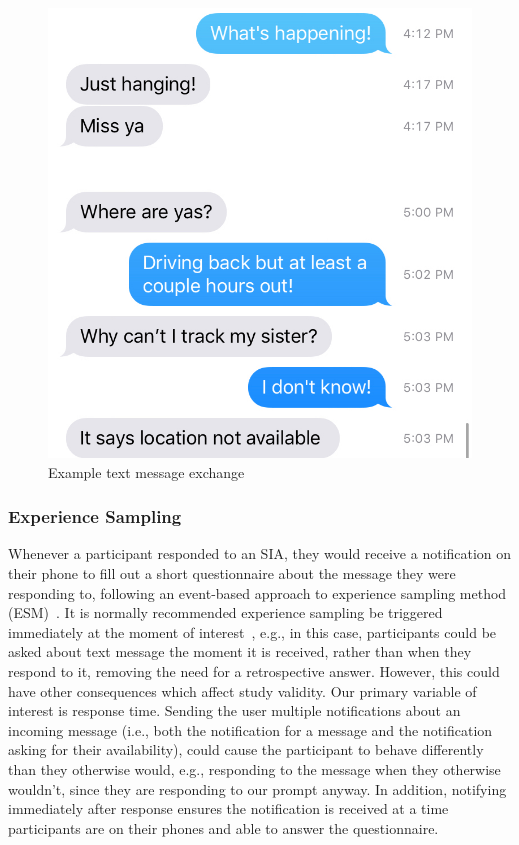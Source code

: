 \documentclass[12pt]{nuthesis}	%
\begin{document}
\begin{figure}[h]
\centering
\includegraphics[width=.7\textwidth]{figures/sia2}
\caption{Example text message exchange}
\label{fig:sia2}
\end{figure}


\subsubsection{Experience Sampling}
\label{sec:esm}

Whenever a participant responded to an SIA, they would receive a notification on their phone to fill out a short questionnaire about the message they were responding to, following an event-based approach to experience sampling method (ESM)~\citep{conner2009experience,csikszentmihalyi2014validity}. It is normally recommended experience sampling  be triggered immediately at the moment of interest~\citep{hormuth1986sampling}, e.g., in this case, participants could be asked about text message the moment it is received, rather than when they respond to it, removing the need for a retrospective answer. However, this could have other consequences which affect study validity. Our primary variable of interest is response time. Sending the user multiple notifications about an incoming message (i.e., both the notification for a message and the notification asking for their availability), could cause the participant to behave differently than they otherwise would, e.g., responding to the message when they otherwise wouldn't, since they are responding to our prompt anyway. In addition, notifying immediately after response ensures the notification is received at a time participants are on their phones and able to answer the questionnaire.
\end{document}
